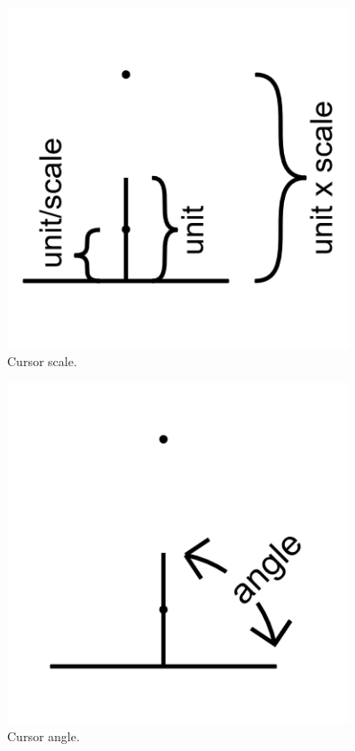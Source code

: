 \begin{figure}
	\centering
	\includegraphics[width=4in]{figures/web2d/cursorscale1.png}
	\caption[cursorscale]
	{Cursor scale.}
\end{figure}
\begin{figure}
	\centering
	\includegraphics[width=4in]{figures/web2d/cursorangle1.png}
	\caption[cursorangle]
	{Cursor angle.}
\end{figure}
